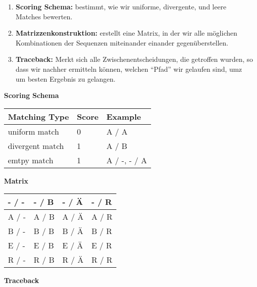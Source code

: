 \begin{enumerate}
\itemsep1pt\parskip0pt
\item
  \textbf{Scoring Schema:} bestimmt, wie wir uniforme, divergente, und
  leere Matches bewerten.
\item
  \textbf{Matrizzenkonstruktion:} erstellt eine Matrix, in der wir alle
  möglichen Kombinationen der Sequenzen miteinander einander
  gegenüberstellen.
\item
  \textbf{Traceback:} Merkt sich alle Zwischenentscheidungen, die
  getroffen wurden, so dass wir nachher ermitteln können, welchen
  ``Pfad'' wir gelaufen sind, umz um besten Ergebnis zu gelangen.
\end{enumerate}





\vspace{0.5cm}\par\noindent\textbf{Scoring Schema}\vspace{0.5cm}

\begin{longtable}[c]{@{}lll@{}}
\toprule
Matching Type & Score & Example\tabularnewline
\midrule
\endhead
uniform match & 0 & A / A\tabularnewline
divergent match & 1 & A / B\tabularnewline
emtpy match & 1 & A / -, - / A\tabularnewline
\bottomrule
\end{longtable}

\vspace{0.5cm}\par\noindent\textbf{Matrix}\vspace{0.5cm}

\begin{tabular}[c]{|l|l|l|l|}
\hline
  - / - & - / B & - / Ä & - / R\\\hline
A / - & A / B & A / Ä & A / R\\\hline
B / - & B / B & B / Ä & B / R\\\hline
E / - & E / B & E / Ä & E / R\\\hline
R / - & R / B & R / Ä & R / R\\\hline
\end{tabular}









\vspace{0.5cm}\par\noindent\textbf{Traceback}\vspace{0.5cm}

